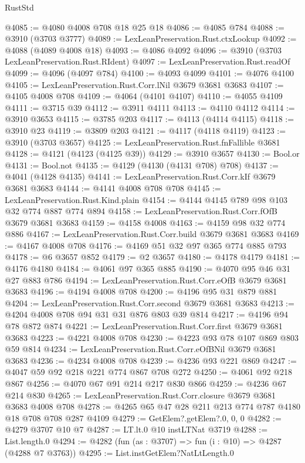 \begin{lexlean}{RustStd}
\begin{coremodule}
@4085 := @4080 @4008 @708 @18 @25 @18
@4086 := @4085 @784
@4088 := @3910 (@3703 @3777)
@4089 := LexLeanPreservation.Rust.ctxLookup
@4092 := @4088 (@4089 @4008 @18)
@4093 := @4086 @4092
@4096 := @3910 (@3703 LexLeanPreservation.Rust.RIdent)
@4097 := LexLeanPreservation.Rust.readOf
@4099 := @4096 (@4097 @784)
@4100 := @4093 @4099
@4101 := @4076 @4100
@4105 := LexLeanPreservation.Rust.Corr.lNil @3679 @3681 @3683
@4107 := @4105 @4008 @708
@4109 := @4064 (@4101 @4107)
@4110 := @4055 @4109
@4111 := @3715 @39
@4112 := @3911 @4111
@4113 := @4110 @4112
@4114 := @3910 @3653
@4115 := @3785 @203
@4117 := @4113 (@4114 @4115)
@4118 := @3910 @23
@4119 := @3809 @203
@4121 := @4117 (@4118 @4119)
@4123 := @3910 (@3703 @3657)
@4125 := LexLeanPreservation.Rust.fnFallible @3681
@4128 := @4121 (@4123 (@4125 @39))
@4129 := @3910 @3657
@4130 := Bool.or
@4131 := Bool.not
@4135 := @4129 (@4130 (@4131 @708) @708)
@4137 := @4041 (@4128 @4135)
@4141 := LexLeanPreservation.Rust.Corr.kIf @3679 @3681 @3683
@4144 := @4141 @4008 @708 @708
@4145 := LexLeanPreservation.Rust.Kind.plain
@4154 := @4144 @4145 @789 @98 @103 @32 @774 @887 @774 @894
@4158 := LexLeanPreservation.Rust.Corr.fOfB @3679 @3681 @3683
@4159 := @4158 @4008
@4163 := @4159 @98 @32 @774 @886
@4167 := LexLeanPreservation.Rust.Corr.build @3679 @3681 @3683
@4169 := @4167 @4008 @708
@4176 := @4169 @51 @32 @97 @365 @774 @885 @793
@4178 := @6 @3657 @852
@4179 := @2 @3657
@4180 := @4178 @4179
@4181 := @4176 @4180
@4184 := @4061 @97 @365 @885
@4190 := @4070 @95 @46 @31 @27 @883 @786
@4194 := LexLeanPreservation.Rust.Corr.eOfB @3679 @3681 @3683
@4196 := @4194 @4008 @708
@4200 := @4196 @95 @31 @879 @881
@4204 := LexLeanPreservation.Rust.Corr.second @3679 @3681 @3683
@4213 := @4204 @4008 @708 @94 @31 @31 @876 @803 @39 @814
@4217 := @4196 @94 @78 @872 @874
@4221 := LexLeanPreservation.Rust.Corr.first @3679 @3681 @3683
@4223 := @4221 @4008 @708
@4230 := @4223 @93 @78 @107 @869 @803 @59 @814
@4234 := LexLeanPreservation.Rust.Corr.eOfBNil @3679 @3681 @3683
@4236 := @4234 @4008 @708
@4239 := @4236 @93 @221 @869
@4247 := @4047 @59 @92 @218 @221 @774 @867 @708 @272
@4250 := @4061 @92 @218 @867
@4256 := @4070 @67 @91 @214 @217 @830 @866
@4259 := @4236 @67 @214 @830
@4265 := LexLeanPreservation.Rust.Corr.closure @3679 @3681 @3683 @4008 @708
@4278 := @4265 @65 @47 @28 @211 @213 @774 @787 @4180 @18 @708 @708 @287 @4109
@4279 := GetElem?.getElem?.{0, 0, 0}
@4282 := @4279 @3707 @10 @7
@4287 := LT.lt.{0} @10 instLTNat @3719
@4288 := List.length.{0}
@4294 := @4282 (fun (as : @3707) => fun (i : @10) => @4287 (@4288 @7 @3763))
@4295 := List.instGetElem?NatLtLength.{0}

\end{coremodule}
\end{lexlean}
